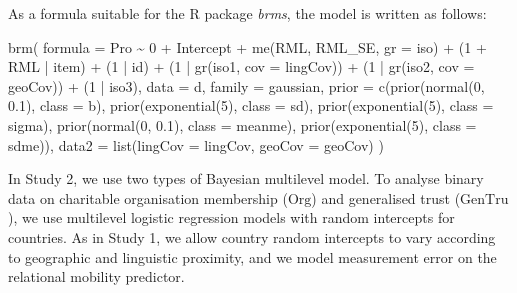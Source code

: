 \documentclass[
  man,floatsintext]{apa6}
\newenvironment{Shaded}{\begin{snugshade}}{\end{snugshade}}
\newcommand{\AttributeTok}[1]{\textcolor[rgb]{0.77,0.63,0.00}{#1}}
\newcommand{\DecValTok}[1]{\textcolor[rgb]{0.00,0.00,0.81}{#1}}
\newcommand{\FloatTok}[1]{\textcolor[rgb]{0.00,0.00,0.81}{#1}}
\newcommand{\FunctionTok}[1]{\textcolor[rgb]{0.00,0.00,0.00}{#1}}
\newcommand{\NormalTok}[1]{#1}
\newcommand{\SpecialCharTok}[1]{\textcolor[rgb]{0.00,0.00,0.00}{#1}}
\begin{document}
As a formula suitable for the R package \emph{brms}, the model is written as follows:

\begin{Shaded}
\begin{Highlighting}[]
\FunctionTok{brm}\NormalTok{(}
  \AttributeTok{formula =}\NormalTok{ Pro }\SpecialCharTok{\textasciitilde{}} \DecValTok{0} \SpecialCharTok{+}\NormalTok{ Intercept }\SpecialCharTok{+} \FunctionTok{me}\NormalTok{(RML, RML\_SE, }\AttributeTok{gr =}\NormalTok{ iso) }\SpecialCharTok{+} 
\NormalTok{    (}\DecValTok{1} \SpecialCharTok{+}\NormalTok{ RML }\SpecialCharTok{|}\NormalTok{ item) }\SpecialCharTok{+}\NormalTok{ (}\DecValTok{1} \SpecialCharTok{|}\NormalTok{ id) }\SpecialCharTok{+}\NormalTok{ (}\DecValTok{1} \SpecialCharTok{|} \FunctionTok{gr}\NormalTok{(iso1, }\AttributeTok{cov =}\NormalTok{ lingCov)) }\SpecialCharTok{+} 
\NormalTok{    (}\DecValTok{1} \SpecialCharTok{|} \FunctionTok{gr}\NormalTok{(iso2, }\AttributeTok{cov =}\NormalTok{ geoCov)) }\SpecialCharTok{+}\NormalTok{ (}\DecValTok{1} \SpecialCharTok{|}\NormalTok{ iso3), }
  \AttributeTok{data =}\NormalTok{ d, }
  \AttributeTok{family =}\NormalTok{ gaussian,}
  \AttributeTok{prior =} \FunctionTok{c}\NormalTok{(}\FunctionTok{prior}\NormalTok{(}\FunctionTok{normal}\NormalTok{(}\DecValTok{0}\NormalTok{, }\FloatTok{0.1}\NormalTok{), }\AttributeTok{class =}\NormalTok{ b),}
            \FunctionTok{prior}\NormalTok{(}\FunctionTok{exponential}\NormalTok{(}\DecValTok{5}\NormalTok{), }\AttributeTok{class =}\NormalTok{ sd),}
            \FunctionTok{prior}\NormalTok{(}\FunctionTok{exponential}\NormalTok{(}\DecValTok{5}\NormalTok{), }\AttributeTok{class =}\NormalTok{ sigma),}
            \FunctionTok{prior}\NormalTok{(}\FunctionTok{normal}\NormalTok{(}\DecValTok{0}\NormalTok{, }\FloatTok{0.1}\NormalTok{), }\AttributeTok{class =}\NormalTok{ meanme),}
            \FunctionTok{prior}\NormalTok{(}\FunctionTok{exponential}\NormalTok{(}\DecValTok{5}\NormalTok{), }\AttributeTok{class =}\NormalTok{ sdme)), }
  \AttributeTok{data2 =} \FunctionTok{list}\NormalTok{(}\AttributeTok{lingCov =}\NormalTok{ lingCov, }\AttributeTok{geoCov =}\NormalTok{ geoCov)}
\NormalTok{  )}
\end{Highlighting}
\end{Shaded}

\newpage

In Study 2, we use two types of Bayesian multilevel model. To analyse binary data on charitable organisation membership (\(\text{Org}\)) and generalised trust (\(\text{GenTru}\)), we use multilevel logistic regression models with random intercepts for countries. As in Study 1, we allow country random intercepts to vary according to geographic and linguistic proximity, and we model measurement error on the relational mobility predictor.
\end{document}
